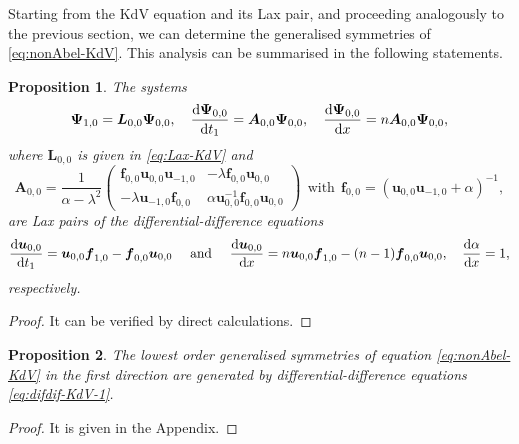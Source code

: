 \documentclass[dvips,10pt]{article}
\newcommand{\bs}{\boldsymbol}
\newcommand{\bsu}{ {\bs{u}}}
\newcommand{\bsf}{ {\bs{f}}}
\newtheorem{proposition}{Proposition}
\theoremstyle{remark} %
\begin{document}
	Starting from the KdV equation and its Lax pair, and proceeding analogously to the previous section, we can determine the generalised symmetries of \eqref{eq:nonAbel-KdV}. This analysis can be summarised in the following statements.
	\begin{proposition}
		The systems 
		\begin{equation} \label{eq:Lax-difdif-KdV-1}
			{\bs{\Psi}}_{1,0} = {\bs{L}}_{0,0} {\bs{\Psi}}_{0,0}, ~~~ \frac{{\rm{d}} {\bs{\Psi}}_{0,0}}{{\rm{d}} t_1} = {\bs{A}}_{0,0} {\bs{\Psi}}_{0,0}, ~~~ \frac{{\rm{d}} {\bs{\Psi}}_{0,0}}{{\rm{d}} x} = n {\bs{A}}_{0,0} {\bs{\Psi}}_{0,0},
		\end{equation}
		where ${\bs{L}}_{0,0}$ is given in \eqref{eq:Lax-KdV} and
		\begin{equation} \label{eq:Lax-difdif-KdV-2}
			{\bs{A}}_{0,0} = \frac{1}{\alpha-\lambda^2} \begin{pmatrix}
				\bsf_{0,0} \bsu_{0,0} \bsu_{-1,0} & -\lambda \bsf_{0,0} \bsu_{0,0} \\ 
				-\lambda \bsu_{-1,0} \bsf_{0,0} & \alpha \bsu_{0,0}^{-1} \bsf_{0,0} \bsu_{0,0}
			\end{pmatrix} ~~ {\text{with}} ~~\bsf_{0,0} = (\bsu_{0,0} \bsu_{-1,0}+\alpha)^{-1},
		\end{equation}
		are Lax pairs of the differential-difference equations
		\begin{equation} \label{eq:difdif-KdV-1}
			\frac{{\rm{d}} {\bs{u}}_{0,0}}{{\rm{d}} t_1} =  {\bs{u}}_{0,0} {\bs{f}}_{1,0} -{\bs{f}}_{0,0}  {\bs{u}}_{0,0} ~~~  {\text{ and }} ~~~ \frac{{\rm{d}} {\bs{u}}_{0,0}}{{\rm{d}} x} =  n {\bs{u}}_{0,0} {\bs{f}}_{1,0} -(n-1) {\bs{f}}_{0,0}  {\bs{u}}_{0,0}, ~~~ 	\frac{{\rm{d}} \alpha}{{\rm{d}} x} = 1,
		\end{equation}
		respectively.
	\end{proposition}
	
	\begin{proof}
		It can be verified by direct calculations.
	\end{proof}
	
	\begin{proposition} \label{prop:KdV-sym-1}
		The lowest order generalised symmetries of equation \eqref{eq:nonAbel-KdV} in the first direction are generated by differential-difference equations \eqref{eq:difdif-KdV-1}.
	\end{proposition}
	
	\begin{proof}
		It is given in the Appendix.
	\end{proof}
	
\end{document}
